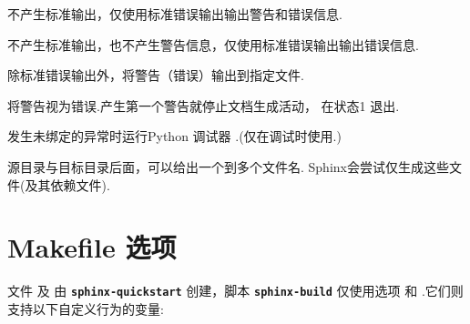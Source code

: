 \documentclass[letterpaper,10pt,english]{sphinxmanual}
\begin{document}

\begin{fulllineitems}
\label{invocation:cmdoption-sphinx-build-q}
不产生标准输出，仅使用标准错误输出输出警告和错误信息.

\end{fulllineitems}


\begin{fulllineitems}
\label{invocation:cmdoption-sphinx-build-Q}
不产生标准输出，也不产生警告信息，仅使用标准错误输出输出错误信息.

\end{fulllineitems}


\begin{fulllineitems}
\label{invocation:cmdoption-sphinx-build-w}
除标准错误输出外，将警告（错误）输出到指定文件.

\end{fulllineitems}


\begin{fulllineitems}
\label{invocation:cmdoption-sphinx-build-W}
将警告视为错误.产生第一个警告就停止文档生成活动，  在状态1 退出.

\end{fulllineitems}


\begin{fulllineitems}
\label{invocation:cmdoption-sphinx-build-P}
发生未绑定的异常时运行Python 调试器 .(仅在调试时使用.)

\end{fulllineitems}


源目录与目标目录后面，可以给出一个到多个文件名.  Sphinx会尝试仅生成这些文件(及其依赖文件).


\section{Makefile 选项}
\label{invocation:makefile}
文件  及  由
\textbf{\texttt{sphinx-quickstart}} 创建，脚本 \textbf{\texttt{sphinx-build}} 仅使用选项
{\hyperref[invocation:cmdoption\string-sphinx\string-build\string-b]{}} 和 {\hyperref[invocation:cmdoption\string-sphinx\string-build\string-d]{}} .它们则支持以下自定义行为的变量:
\end{document}
